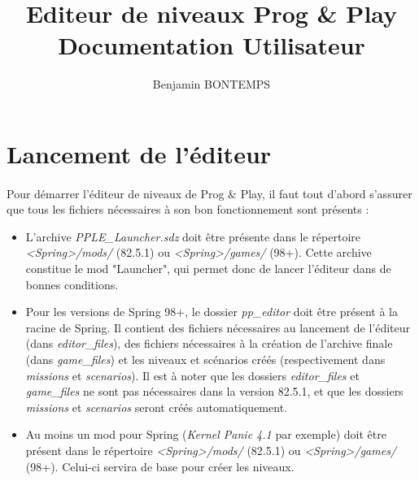 \documentclass[a4paper]{article}
\title{Editeur de niveaux Prog \& Play\\ Documentation Utilisateur}
\author{Benjamin BONTEMPS}
\begin{document}
\maketitle

\tableofcontents

\newpage

\section{Lancement de l'éditeur}
\paragraph{ }
Pour démarrer l'éditeur de niveaux de Prog \& Play, il faut tout d'abord s'assurer que tous les fichiers nécessaires à son bon fonctionnement sont présents :
\begin{itemize}
\item L'archive \textit{PPLE\_Launcher.sdz} doit être présente dans le répertoire \textit{<Spring>/mods/} (82.5.1) ou \textit{<Spring>/games/} (98+). Cette archive constitue le mod "Launcher", qui permet donc de lancer l'éditeur dans de bonnes conditions.
\item Pour les versions de Spring 98+, le dossier \textit{pp\_editor} doit être présent à la racine de Spring. Il contient des fichiers nécessaires au lancement de l'éditeur (dans \textit{editor\_files}), des fichiers nécessaires à la création de l'archive finale (dans \textit{game\_files}) et les niveaux et scénarios créés (respectivement dans \textit{missions} et \textit{scenarios}). Il est à noter que les dossiers \textit{editor\_files} et \textit{game\_files} ne sont pas nécessaires dans la version 82.5.1, et que les dossiers \textit{missions} et \textit{scenarios} seront créés automatiquement.
\item Au moins un mod pour Spring (\textit{Kernel Panic 4.1} par exemple) doit être présent dans le répertoire \textit{<Spring>/mods/} (82.5.1) ou \textit{<Spring>/games/} (98+). Celui-ci servira de base pour créer les niveaux.
\end{itemize}
\end{document}
